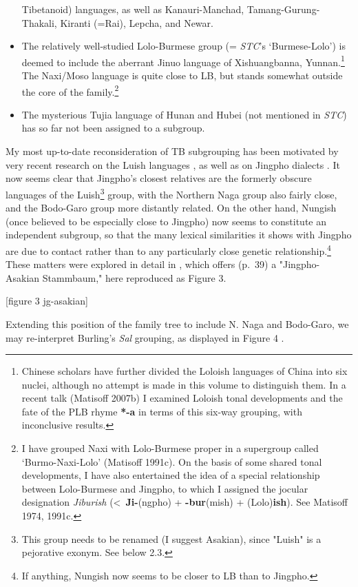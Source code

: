 \begin{itemize}
\mbox{Tibetanoid}) languages, as well as Kanauri-Manchad, Tamang-Gurung-Thakali,
Kiranti (=Rai), Lepcha, and Newar.
\item The relatively well-studied Lolo-Burmese group (= \textit{STC}’s ‘Burmese-Lolo’) is
deemed to include the aberrant Jinuo language of Xishuangbanna,
Yunnan.\footnote{Chinese scholars have further divided the Loloish languages of
China into six nuclei, although no attempt is made in this volume to distinguish
them.  In a recent talk (Matisoff 2007b) I examined Loloish tonal developments
and the fate of the PLB rhyme \textbf{*-a} in terms of this six-way grouping, with
inconclusive results.}  The Naxi/Moso language is quite close to LB, but stands
somewhat outside the core of the family.\footnote{I have grouped Naxi with
Lolo-Burmese proper in a supergroup called ‘Burmo-Naxi-Lolo’ (Matisoff 1991c). 
On the basis of some shared tonal developments, I have also entertained the idea
of a special relationship between Lolo-Burmese and Jingpho, to which I assigned
the jocular designation \textit{Jiburish} (<~\textbf{Ji-}(ngpho)
+ \textbf{-bur}(mish) + (Lolo)\textbf{ish}).  See
Matisoff 1974, 1991c.}
\item The mysterious Tujia language of Hunan and Hubei (not mentioned in \textit{STC}) has so
far not been assigned to a subgroup.
\end{itemize}

My most up-to-date reconsideration of TB subgrouping has been motivated by very recent research on the Luish languages \citep{Huziwara2008,Huziwara2012,Sangdong2013}, as well as on Jingpho dialects \citep{Kurabe2013}. It now seems clear that Jingpho's closest relatives are the formerly obscure languages of the Luish\footnote{This group needs to be renamed (I suggest Asakian), since "Luish" is a pejorative exonym. See below 2.3.} group, with the Northern Naga group also fairly close, and the Bodo-Garo group more distantly related. On the other hand, Nungish (once believed to be especially close to Jingpho) now seems to constitute an independent subgroup, so that the many lexical similarities it shows with Jingpho are due to contact rather than to any particularly close genetic relationship.\footnote{If anything, Nungish now seems to be closer to LB than to Jingpho.} These matters were explored in detail in \citealt{Matisoff2013}, which offers (p.\ 39) a "Jingpho-Asakian Stammbaum," here reproduced as Figure 3.

[figure 3 jg-asakian]

Extending this position of the family tree to include N. Naga and Bodo-Garo, we may re-interpret Burling's {\it Sal} grouping, as displayed in Figure 4 \citep[40]{Matisoff2013}.

